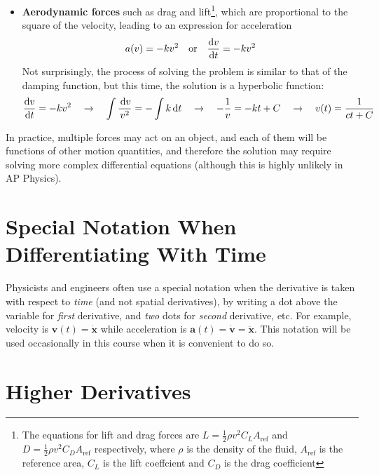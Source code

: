 \documentclass{../../oss-handout}
\begin{document}
\begin{itemize}[leftmargin=15pt]
\item\textbf{Aerodynamic forces} such as drag and lift\footnote{The equations
  for lift and drag forces are $L=\frac12\rho v^2C_LA_\mathrm{ref}$ and
  $D=\frac12\rho v^2C_DA_\text{ref}$ respectively, where $\rho$ is the density
  of the fluid, $A_\text{ref}$ is the reference area, $C_L$ is the lift
  coeffcient and $C_D$ is the drag coefficient}, which are proportional
  to the square of the velocity, leading to an expression for acceleration 
  \begin{equation*}
    a(v)=-kv^2\quad\text{or}\quad \diff vt=-kv^2
  \end{equation*}
  Not surprisingly, the process of solving the problem is similar to that of
  the damping function, but this time, the solution is a hyperbolic function:
  \begin{equation*}
    \diff vt=-kv^2\quad\rightarrow\quad \int\frac{\dl v}{v^2}=-\int k\dl t
    \quad\rightarrow\quad -\frac1v=-kt+C
    \quad\rightarrow\quad v(t)=\frac{1}{ct+C}
  \end{equation*}
\end{itemize}
In practice, multiple forces may act on an object, and each of them will be
functions of other motion quantities, and therefore the solution may require
solving more complex differential equations (although this is highly unlikely in
AP Physics).

\section{Special Notation When Differentiating With Time}

Physicists and engineers often use a special notation when the derivative is
taken with respect to \emph{time} (and not spatial derivatives), by writing a
dot above the variable for \emph{first} derivative, and \emph{two} dots for
\emph{second} derivative, etc. For example, velocity is
$\bm{v}(t)=\dot{\bm{x}}$ while acceleration is
$\bm{a}(t)= \dot{\bm{v}}=\ddot{\bm{x}}$. This notation will be used occasionally
in this course when it is convenient to do so.


\section{Higher Derivatives}
\end{document}
